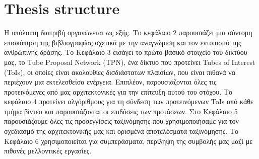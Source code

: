 \section{\en Thesis structure\gr}

Η υπόλοιπη διατριβή οργανώνεται ως εξής. Το κεφάλαιο 2  παρουσιάζει μια σύντομη επισκόπηση της βιβλιογραφίας σχετικά με την αναγνώριση και τον εντοπισμό της ανθρώπινης δράσης.
Το Κεφάλαιο 3 εισάγει το πρώτο βασικό στοιχείο του δικτύου μας, το \en Tube Proposal Network (TPN)\gr, ένα δίκτυο που προτείνει \en Tubes of Interest (ToIs)\gr,
οι οποίες είναι ακολουθίες δισδιάστατων πλαισίων, που είναι πιθανά να περιέχουν μια εκτελεσθείσα ενέργεια.
Επιπλέον, παρουσιάζονται  όλες τις προτεινόμενες από μας αρχιτεκτονικές για την επίτευξη αυτού του στόχου.
Το κεφάλαιο 4 προτείνει αλγόριθμους για τη σύνδεση των προτεινόμενων \en ToIs \gr από κάθε τμήμα βίντεο και παρουσιάζονται οι επιδόσεις των προτάσεων.
Στο Κεφάλαιο 5 παρουσιάζουμε όλες τις προσεγγίσεις ταξινόμησης που χρησιμοποιήσαμε για τον σχεδιασμό της αρχιτεκτονικής μας και ορισμένα αποτελέσματα ταξινόμησης.
Το Κεφάλαιο 6 χρησιμοποιείται για συμπεράσματα, περίληψη της συμβολής μας μαζί με πιθανές μελλοντικές εργασίες.

% 
